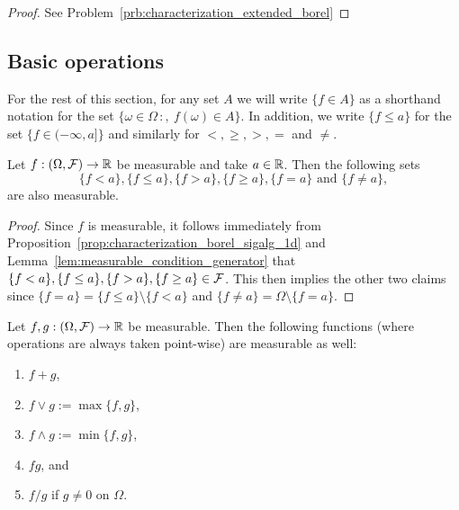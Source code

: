 \begin{proof}
See Problem~\ref{prb:characterization_extended_borel}
\end{proof}

\subsection{Basic operations}

For the rest of this section, for any set $A$ we will write $\{f \in A\}$ as a shorthand notation for the set $\{\omega \in \Omega \, :,\ f(\omega) \in A\}$. In addition, we write $\{f \le a\}$ for the set $\{f \in (-\infty, a]\}$ and similarly for $<, \ge, >, =$ and $\ne$.

\begin{lemma}\label{lem:measurable_set_real_line}
Let $f : (\Omega, \mathcal F) \to \mathbb R$ be measurable and take $a \in \mathbb R$. Then the following sets 
\[
	\{f < a\}, \{f \le a\}, \{f > a\}, \{f \ge a\}, \{f = a\} \text{ and } \{f \ne a\},
\]
are also measurable.
\end{lemma}

\begin{proof}
Since $f$ is measurable, it follows immediately from Proposition~\ref{prop:characterization_borel_sigalg_1d} and Lemma~\ref{lem:measurable_condition_generator} that $\{f < a\}, \{f \le a\},\{f > a\}, \{f \ge a\} \in \mathcal F$. This then implies the other two claims since $\{f = a\} = \{f \le a\} \setminus \{f < a\}$ and $\{f \ne a\} = \Omega \setminus \{f = a\}$.
\end{proof}

\begin{lemma}\label{lem:basic_properties_measurable_functions}
Let $f, g : (\Omega, \mathcal F) \to \mathbb R$ be measurable. Then the following functions (where operations are always taken point-wise) are measurable as well:
\begin{enumerate}
\item $f + g$,
\item $f \vee g := \max\{f,g\}$,
\item $f \wedge g := \min\{f,g\}$,
\item $f g$, and
\item $f/g$ if $g \ne 0$ on $\Omega$.
\end{enumerate} 
\end{lemma}

